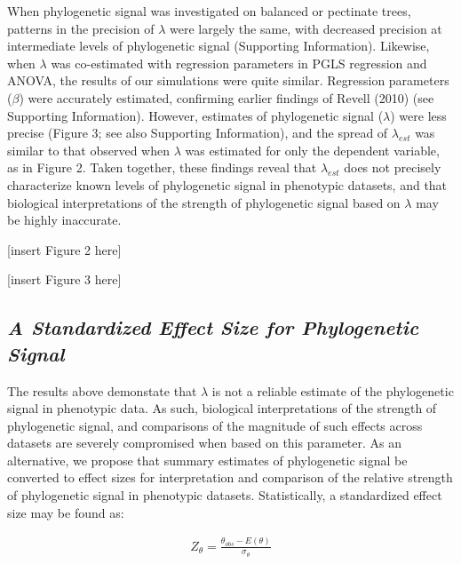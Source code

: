 \documentclass[]{article}
\begin{document}
When phylogenetic signal was investigated on balanced or pectinate
trees, patterns in the precision of \(\lambda\) were largely the same,
with decreased precision at intermediate levels of phylogenetic signal
(Supporting Information). Likewise, when \(\lambda\) was co-estimated
with regression parameters in PGLS regression and ANOVA, the results of
our simulations were quite similar. Regression parameters (\(\beta\))
were accurately estimated, confirming earlier findings of Revell (2010)
(see Supporting Information). However, estimates of phylogenetic signal
(\(\lambda\)) were less precise (Figure 3; see also Supporting
Information), and the spread of \(\lambda_{est}\) was similar to that
observed when \(\lambda\) was estimated for only the dependent variable,
as in Figure 2. Taken together, these findings reveal that
\(\lambda_{est}\) does not precisely characterize known levels of
phylogenetic signal in phenotypic datasets, and that biological
interpretations of the strength of phylogenetic signal based on
\(\lambda\) may be highly inaccurate. \hfill\break

{[}insert Figure 2 here{]} \hfill\break

{[}insert Figure 3 here{]} \hfill\break 

\hypertarget{a-standardized-effect-size-for-phylogenetic-signal}{%
\subsection{\texorpdfstring{\emph{A Standardized Effect Size for
Phylogenetic
Signal}}{A Standardized Effect Size for Phylogenetic Signal}}\label{a-standardized-effect-size-for-phylogenetic-signal}}

The results above demonstate that \(\lambda\) is not a reliable estimate
of the phylogenetic signal in phenotypic data. As such, biological
interpretations of the strength of phylogenetic signal, and comparisons
of the magnitude of such effects across datasets are severely
compromised when based on this parameter. As an alternative, we propose
that summary estimates of phylogenetic signal be converted to effect
sizes for interpretation and comparison of the relative strength of
phylogenetic signal in phenotypic datasets. Statistically, a
standardized effect size may be found as:

\begin{align}
    Z_{\theta}=\frac{\theta_{obs}-E(\theta)}{\sigma_\theta}
\end{align}
\end{document}
